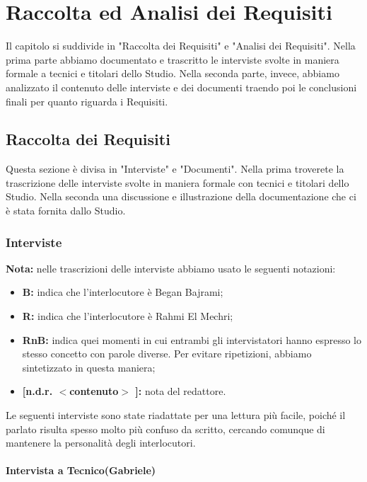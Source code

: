 \documentclass{elegantbook}
\begin{document}
	\chapter{Raccolta ed Analisi dei Requisiti}
	
	Il capitolo si suddivide in "Raccolta dei Requisiti" e "Analisi dei Requisiti".
        Nella prima parte abbiamo documentato e trascritto le interviste svolte in maniera formale a tecnici e titolari dello Studio.
        Nella seconda parte, invece, abbiamo analizzato il contenuto delle interviste e dei documenti traendo poi le conclusioni finali per quanto riguarda i Requisiti.
	
	\section{Raccolta dei Requisiti}
	
	Questa sezione è divisa in "Interviste" e "Documenti".
        Nella prima troverete la trascrizione delle interviste svolte in maniera formale con tecnici e titolari dello Studio.
        Nella seconda una discussione e illustrazione della documentazione che ci è stata fornita dallo Studio.
	
	\subsection{Interviste}
	\textbf{Nota:} nelle trascrizioni delle interviste abbiamo usato le seguenti notazioni:
	\begin{itemize}
		\item \textbf{B:} indica che l'interlocutore è Began Bajrami;
		\item \textbf{R:} indica che l'interlocutore è Rahmi El Mechri;
		\item \textbf{RnB:} indica quei momenti in cui entrambi gli intervistatori hanno espresso lo stesso concetto con parole diverse.
                    Per evitare ripetizioni, abbiamo sintetizzato in questa maniera;
		\item \textbf{[n.d.r. $<$contenuto$>$ ]:} nota del redattore.
	\end{itemize}
	
	Le seguenti interviste sono state riadattate per una lettura più facile, poiché il parlato risulta spesso molto più confuso da scritto,
        cercando comunque di mantenere la personalità degli interlocutori.
	
	\subsubsection{Intervista a Tecnico(Gabriele)}
	
\end{document}
